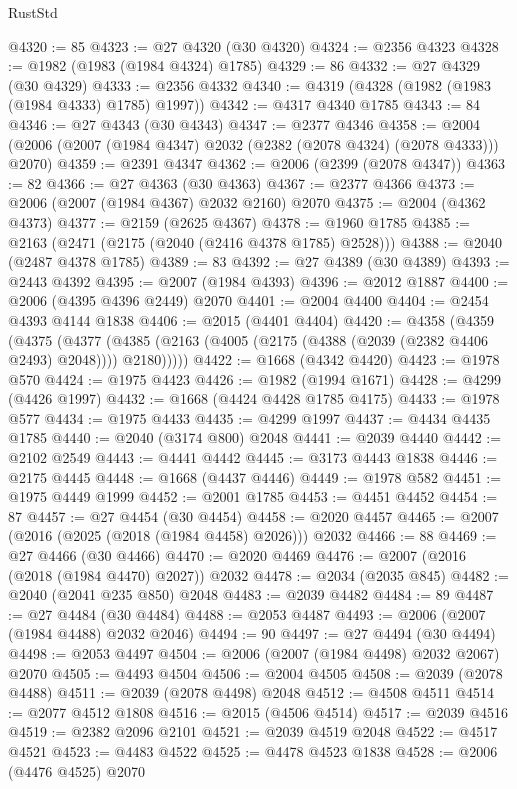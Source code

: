\begin{lexlean}{RustStd}
\begin{coremodule}
@4320 := 85
@4323 := @27 @4320 (@30 @4320)
@4324 := @2356 @4323
@4328 := @1982 (@1983 (@1984 @4324) @1785)
@4329 := 86
@4332 := @27 @4329 (@30 @4329)
@4333 := @2356 @4332
@4340 := @4319 (@4328 (@1982 (@1983 (@1984 @4333) @1785) @1997))
@4342 := @4317 @4340 @1785
@4343 := 84
@4346 := @27 @4343 (@30 @4343)
@4347 := @2377 @4346
@4358 := @2004 (@2006 (@2007 (@1984 @4347) @2032 (@2382 (@2078 @4324) (@2078 @4333))) @2070)
@4359 := @2391 @4347
@4362 := @2006 (@2399 (@2078 @4347))
@4363 := 82
@4366 := @27 @4363 (@30 @4363)
@4367 := @2377 @4366
@4373 := @2006 (@2007 (@1984 @4367) @2032 @2160) @2070
@4375 := @2004 (@4362 @4373)
@4377 := @2159 (@2625 @4367)
@4378 := @1960 @1785
@4385 := @2163 (@2471 (@2175 (@2040 (@2416 @4378 @1785) @2528)))
@4388 := @2040 (@2487 @4378 @1785)
@4389 := 83
@4392 := @27 @4389 (@30 @4389)
@4393 := @2443 @4392
@4395 := @2007 (@1984 @4393)
@4396 := @2012 @1887
@4400 := @2006 (@4395 @4396 @2449) @2070
@4401 := @2004 @4400
@4404 := @2454 @4393 @4144 @1838
@4406 := @2015 (@4401 @4404)
@4420 := @4358
    (@4359
      (@4375
        (@4377 (@4385 (@2163 (@4005 (@2175 (@4388 (@2039 (@2382 @4406 @2493) @2048)))) @2180)))))
@4422 := @1668 (@4342 @4420)
@4423 := @1978 @570
@4424 := @1975 @4423
@4426 := @1982 (@1994 @1671)
@4428 := @4299 (@4426 @1997)
@4432 := @1668 (@4424 @4428 @1785 @4175)
@4433 := @1978 @577
@4434 := @1975 @4433
@4435 := @4299 @1997
@4437 := @4434 @4435 @1785
@4440 := @2040 (@3174 @800) @2048
@4441 := @2039 @4440
@4442 := @2102 @2549
@4443 := @4441 @4442
@4445 := @3173 @4443 @1838
@4446 := @2175 @4445
@4448 := @1668 (@4437 @4446)
@4449 := @1978 @582
@4451 := @1975 @4449 @1999
@4452 := @2001 @1785
@4453 := @4451 @4452
@4454 := 87
@4457 := @27 @4454 (@30 @4454)
@4458 := @2020 @4457
@4465 := @2007 (@2016 (@2025 (@2018 (@1984 @4458) @2026))) @2032
@4466 := 88
@4469 := @27 @4466 (@30 @4466)
@4470 := @2020 @4469
@4476 := @2007 (@2016 (@2018 (@1984 @4470) @2027)) @2032
@4478 := @2034 (@2035 @845)
@4482 := @2040 (@2041 @235 @850) @2048
@4483 := @2039 @4482
@4484 := 89
@4487 := @27 @4484 (@30 @4484)
@4488 := @2053 @4487
@4493 := @2006 (@2007 (@1984 @4488) @2032 @2046)
@4494 := 90
@4497 := @27 @4494 (@30 @4494)
@4498 := @2053 @4497
@4504 := @2006 (@2007 (@1984 @4498) @2032 @2067) @2070
@4505 := @4493 @4504
@4506 := @2004 @4505
@4508 := @2039 (@2078 @4488)
@4511 := @2039 (@2078 @4498) @2048
@4512 := @4508 @4511
@4514 := @2077 @4512 @1808
@4516 := @2015 (@4506 @4514)
@4517 := @2039 @4516
@4519 := @2382 @2096 @2101
@4521 := @2039 @4519 @2048
@4522 := @4517 @4521
@4523 := @4483 @4522
@4525 := @4478 @4523 @1838
@4528 := @2006 (@4476 @4525) @2070

\end{coremodule}
\end{lexlean}
